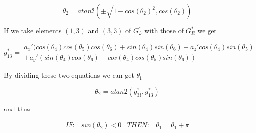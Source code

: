 \begin{equation}
\theta_2 = atan2(\pm \sqrt{1-cos(\theta_2)^2}, cos(\theta_2))
\end{equation}

If we take elements $(1,3)$ and $(3,3)$ of $G^*_L$ with those of $G^*_R$ we get

\begin{equation}
g^*_{13} = \begin{array}{l} a_x'( cos(\theta_4)cos(\theta_5)cos(\theta_6) + sin(\theta_4)sin(\theta_6) + a_z'cos(\theta_4)sin(\theta_5) \\
+ a_y'(sin(\theta_4)cos(\theta_6)-cos(\theta_4)cos(\theta_5)sin(\theta_6))
\end{array}
\end{equation}

By dividing these two equations we can get $\theta_1$

\begin{equation}
\theta_2 = atan2(g^*_{33}, g^*_{13})
\end{equation}

and thus

\begin{equation}
\begin{array}{rcrc}IF:& sin(\theta_2)<0 & THEN: & \theta_1 = \theta_1 + \pi
\end{array}
\end{equation}